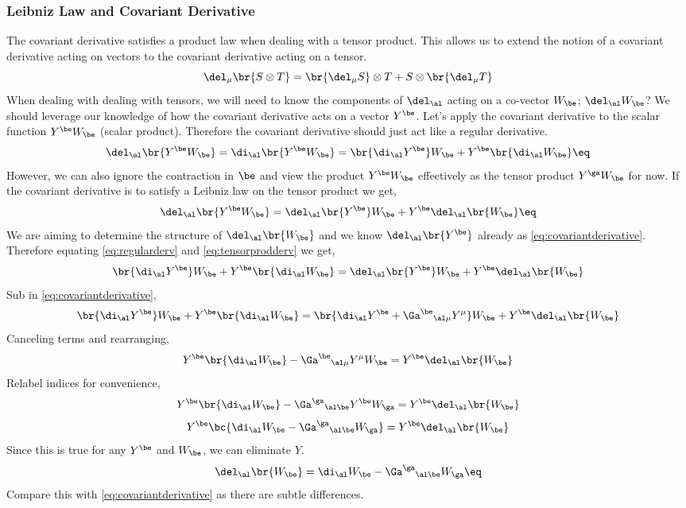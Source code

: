 \documentclass{article}
\begin{document}
\subsubsection{Leibniz Law and Covariant Derivative}
The covariant derivative satisfies a product law when dealing with a tensor product. This allows us to extend the notion of a covariant derivative acting on vectors to the covariant derivative acting on a tensor.
\[ \del_\mu \br{S \otimes T} = \br{\del_\mu S} \otimes T + S \otimes \br{\del_\mu T}  \]
When dealing with dealing with tensors, we will need to know the components of $\del_\al$ acting on a co-vector $W_\be$; $\del_\al W_\be$? We should leverage our knowledge of how the covariant derivative acts on a vector $Y^\be$. Let's apply the covariant derivative to the scalar function $Y^\be W_\be$ (scalar product). Therefore the covariant derivative should just act like a regular derivative.
\[ \del_\al \br{Y^\be W_\be} = \di_\al \br{Y^\be W_\be} = \br{\di_\al Y^\be} W_\be + Y^\be \br{\di_\al W_\be} \eq \label{eq:regularderv} \]
However, we can also ignore the contraction in $\be$ and view the product $Y^\be W_\be$ effectively as the tensor product $Y^\ga W_\be$ for now. If the covariant derivative is to satisfy a Leibniz law on the tensor product we get,
\[ \del_\al \br{Y^\be W_\be} = \del_\al \br{Y^\be} W_\be + Y^\be \del_\al \br{W_\be} \eq \label{eq:tensorprodderv} \]
We are aiming to determine the structure of $\del_\al \br{W_\be}$ and we know $\del_\al \br{Y^\be}$ already as \eqref{eq:covariantderivative}. Therefore equating \eqref{eq:regularderv} and \eqref{eq:tensorprodderv} we get,
\[ \br{\di_\al Y^\be} W_\be + Y^\be \br{\di_\al W_\be} = \del_\al \br{Y^\be} W_\be + Y^\be \del_\al \br{W_\be}\]
Sub in \eqref{eq:covariantderivative},
\[ \br{\di_\al Y^\be} W_\be + Y^\be \br{\di_\al W_\be} = \br{\di_\al Y^\be + {\Ga^\be}_{\al\mu}Y^\mu} W_\be + Y^\be \del_\al \br{W_\be}\]
Canceling terms and rearranging,
\[ Y^\be \br{\di_\al W_\be} -{\Ga^\be}_{\al\mu}Y^\mu W_\be = Y^\be \del_\al \br{W_\be}\]
Relabel indices for convenience,
\[ Y^\be \br{\di_\al W_\be} -{\Ga^\ga}_{\al\be}Y^\be W_\ga = Y^\be \del_\al \br{W_\be}\]
\[ Y^\be \bc{\di_\al W_\be -{\Ga^\ga}_{\al\be}W_\ga} = Y^\be \del_\al \br{W_\be}\]
Since this is true for any $Y^\be$ and $W_\be$, we can eliminate $Y$.
\[ \del_\al \br{W_\be} = \di_\al W_\be -{\Ga^\ga}_{\al\be}W_\ga \eq \label{eq:covariantderivativeco} \]
Compare this with \eqref{eq:covariantderivative} as there are subtle differences.\\
\end{document}
